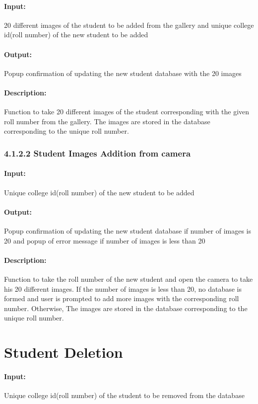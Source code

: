 \paragraph{Input:}
20 different images of the student to be added from the gallery and unique
college id(roll number) of the new student to be added
\paragraph{Output:}
Popup confirmation of updating the new student database with the 20 images
\paragraph{Description:}
Function to take 20 different images of the student corresponding with the
given roll number from the gallery. The images are stored in the database
corresponding to the unique roll number.


\subsubsection{4.1.2.2 Student Images Addition from camera}
\paragraph{Input:}
Unique college id(roll number) of the new student to be added
\paragraph{Output:}
Popup confirmation of updating the new student database if number of images
is 20 and popup of error message if number of images is less than 20
\paragraph{Description:}
Function to take the roll number of the new student and open the camera to
take his 20 different images. If the number of images is less than 20, no database
is formed and user is prompted to add more images with the corresponding roll number.
Otherwise, The images are stored in the database corresponding to the unique roll number.


\section{Student Deletion}
\paragraph{Input:}
Unique college id(roll number) of the student to be removed from the database

